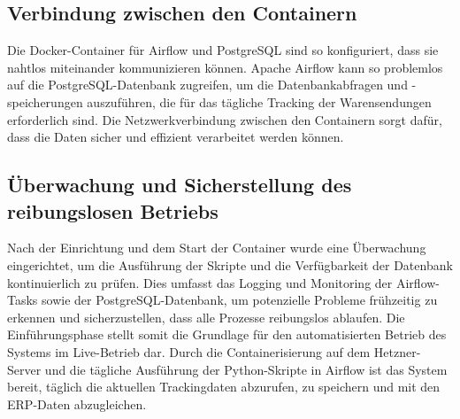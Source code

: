 \subsection{Verbindung zwischen den Containern}
\label{sec:Verbindung zwischen den Containern}
Die Docker-Container für Airflow und PostgreSQL sind so konfiguriert, dass sie nahtlos miteinander kommunizieren können. 
Apache Airflow kann so problemlos auf die PostgreSQL-Datenbank zugreifen, um die Datenbankabfragen und -speicherungen 
auszuführen, die für das tägliche Tracking der Warensendungen erforderlich sind. Die Netzwerkverbindung zwischen den 
Containern sorgt dafür, dass die Daten sicher und effizient verarbeitet werden können.

\subsection{Überwachung und Sicherstellung des reibungslosen Betriebs}
\label{sec:UeberwachungBetrieb}
Nach der Einrichtung und dem Start der Container wurde eine Überwachung eingerichtet, um die Ausführung der Skripte und die 
Verfügbarkeit der Datenbank kontinuierlich zu prüfen. Dies umfasst das Logging und Monitoring der Airflow-Tasks sowie 
der PostgreSQL-Datenbank, um potenzielle Probleme frühzeitig zu erkennen und sicherzustellen, dass alle Prozesse reibungslos ablaufen.
Die Einführungsphase stellt somit die Grundlage für den automatisierten Betrieb des Systems im Live-Betrieb dar. 
Durch die Containerisierung auf dem Hetzner-Server und die tägliche Ausführung der Python-Skripte in Airflow ist 
das System bereit, täglich die aktuellen Trackingdaten abzurufen, zu speichern und mit den \ac{ERP}-Daten abzugleichen.
